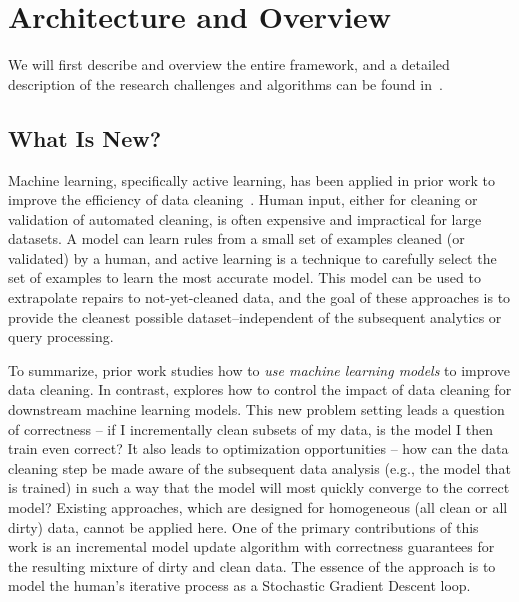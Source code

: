 \section{Architecture and Overview}\label{arch}
We will first describe \sys and overview the entire framework, and a detailed description of the research challenges and algorithms can be found in~\cite{activecleanarxiv}.

\subsection{What Is New?}
Machine learning, specifically active learning, has been applied in prior work to improve the efficiency of data cleaning~\cite{yakout2013don,DBLP:journals/pvldb/YakoutENOI11,gokhale2014corleone}.
Human input, either for cleaning or validation of automated cleaning, is often expensive and impractical for large datasets.
A model can learn rules from a small set of examples cleaned (or validated) by a human, and active learning is a technique to carefully select the set of examples to learn the most accurate model.
This model can be used to extrapolate repairs to not-yet-cleaned data, and the goal of these approaches is to provide the cleanest possible dataset--independent of the subsequent analytics or query processing.

To summarize, prior work studies how to \emph{use machine learning models} to improve data cleaning.
In contrast, \sys explores how to control the impact of data cleaning for downstream machine learning models.
This new problem setting leads a question of correctness -- if I incrementally clean subsets of my data, is the model I then train even correct?  
It also leads to optimization opportunities -- how can the data cleaning step be made aware of the subsequent data analysis (e.g., the model that is trained) 
in such a way that the model will most quickly converge to the correct model?
Existing approaches, which are designed for homogeneous (all clean or all dirty) data, cannot be applied here.
One of the primary contributions of this work is an incremental model update algorithm with correctness guarantees for the resulting mixture of dirty and clean data.
The essence of the approach is to model the human's iterative process as a Stochastic Gradient Descent loop.

